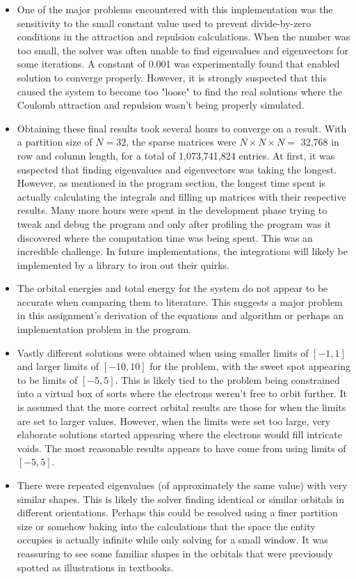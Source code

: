 \documentclass[10pt, oneside, letterpaper]{article}
\begin{document}
\begin{itemize}
    \item One of the major problems encountered with this implementation was the sensitivity to the small constant value used to prevent divide-by-zero conditions in the attraction and repulsion calculations. When the number was too small, the solver was often unable to find eigenvalues and eigenvectors for some iterations. A constant of 0.001 was experimentally found that enabled solution to converge properly. However, it is strongly suspected that this caused the system to become too "loose" to find the real solutions where the Coulomb attraction and repulsion wasn't being properly simulated.
    \item Obtaining these final results took several hours to converge on a result. With a partition size of $N=32$, the sparse matrices were $N \times N \times N = $ 32,768 in row and column length, for a total of 1,073,741,824 entries. At first, it was suspected that finding eigenvalues and eigenvectors was taking the longest. However, as mentioned in the program section, the longest time spent is actually calculating the integrals and filling up matrices with their respective results. Many more hours were spent in the development phase trying to tweak and debug the program and only after profiling the program was it discovered where the computation time was being spent. This was an incredible challenge. In future implementations, the integrations will likely be implemented by a library to iron out their quirks.
    \item The orbital energies and total energy for the system do not appear to be accurate when comparing them to literature. This suggests a major problem in this assignment's derivation of the equations and algorithm or perhaps an implementation problem in the program.
    \item Vastly different solutions were obtained when using smaller limits of $[-1,1]$ and larger limits of $[-10,10]$ for the problem, with the sweet spot appearing to be limits of $[-5,5]$. This is likely tied to the problem being constrained into a virtual box of sorts where the electrons weren't free to orbit further. It is assumed that the more correct orbital results are those for when the limits are set to larger values. However, when the limits were set too large, very elaborate solutions started appearing where the electrons would fill intricate voids. The most reasonable results appears to have come from using limits of $[-5,5]$.
    \item There were repeated eigenvalues (of approximately the same value) with very similar shapes. This is likely the solver finding identical or similar orbitals in different orientations. Perhaps this could be resolved using a finer partition size or somehow baking into the calculations that the space the entity occupies is actually infinite while only solving for a small window. It was reassuring to see some familiar shapes in the orbitals that were previously spotted as illustrations in textbooks.

\end{itemize}
\end{document}

